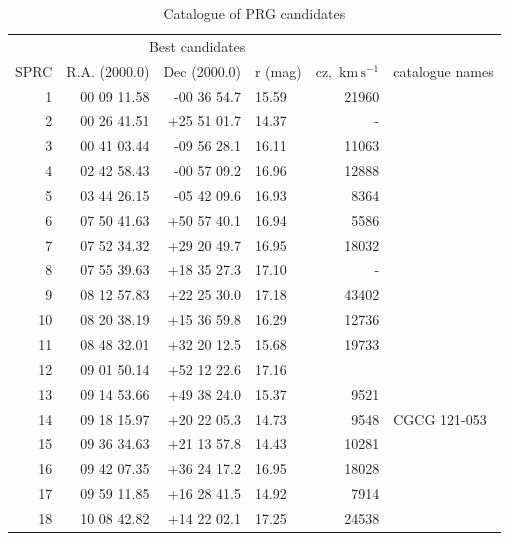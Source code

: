 \documentclass[useAMS,usenatbib]{mn2e}
\newcommand{\km}{\,\mbox{km}\,\mbox{s}^{-1}}
\begin{document}
\newpage






\begin{table}
\caption{Catalogue of PRG candidates} \label{tab_ABCD}
\begin{tabular}{rrrlrl}
\hline
\hline
\multicolumn{5}{c}{Best candidates}\\
SPRC&   R.A. (2000.0)& Dec (2000.0)& r (mag)&   cz, $\km$ & catalogue names      \\
   1 &  00 09 11.58 & -00 36 54.7 &  15.59 &  21960 &                  \\
   2 &  00 26 41.51 & +25 51 01.7 &  14.37 &      - &                  \\
   3 &  00 41 03.44 & -09 56 28.1 &  16.11 &  11063 &                  \\
   4 &  02 42 58.43 & -00 57 09.2 &  16.96 &  12888 &                  \\
   5 &  03 44 26.15 & -05 42 09.6 &  16.93 &   8364 &                  \\
   6 &  07 50 41.63 & +50 57 40.1 &  16.94 &   5586 &                  \\
   7 &  07 52 34.32 & +29 20 49.7 &  16.95 &  18032 &                  \\
   8 &  07 55 39.63 & +18 35 27.3 &  17.10 &      - &                  \\
   9 &  08 12 57.83 & +22 25 30.0 &  17.18 &  43402 &                  \\
  10 &  08 20 38.19 & +15 36 59.8 &  16.29 &  12736 &                  \\
  11 &  08 48 32.01 & +32 20 12.5 &  15.68 &  19733 &                  \\
  12 &  09 01 50.14 & +52 12 22.6 &  17.16 &        &                  \\
  13 &  09 14 53.66 & +49 38 24.0 &  15.37 &   9521 &                  \\
  14 &  09 18 15.97 & +20 22 05.3 &  14.73 &   9548 &     CGCG 121-053 \\
  15 &  09 36 34.63 & +21 13 57.8 &  14.43 &  10281 &                  \\
  16 &  09 42 07.35 & +36 24 17.2 &  16.95 &  18028 &                  \\
  17 &  09 59 11.85 & +16 28 41.5 &  14.92 &   7914 &                  \\
  18 &  10 08 42.82 & +14 22 02.1 &  17.25 &  24538 &                  \\

\end{tabular}
\end{table}
\end{document}
